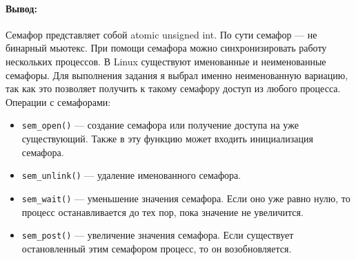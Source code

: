 \paragraph{Вывод:}
Семафор представляет собой atomic unsigned int.
По сути семафор --- не бинарный мьютекс.
При помощи семафора можно синхронизировать работу нескольких процессов.
В Linux существуют именованные и неименованные семафоры.
Для выполнения задания я выбрал именно неименованную вариацию, так как это позволяет получить к такому семафору доступ из любого процесса.
Операции с семафорами:
\begin{itemize}
    \item \texttt{sem\_open()} --- создание семафора или получение доступа на уже существующий.
    Также в эту функцию может входить инициализация семафора.
    \item \texttt{sem\_unlink()} --- удаление именованного семафора.
    \item \texttt{sem\_wait()} --- уменьшение значения семафора.
    Если оно уже равно нулю, то процесс останавливается до тех пор, пока значение не увеличится.
    \item \texttt{sem\_post()} --- увеличение значения семафора.
    Если существует остановленный этим семафором процесс, то он возобновляется.
\end{itemize}